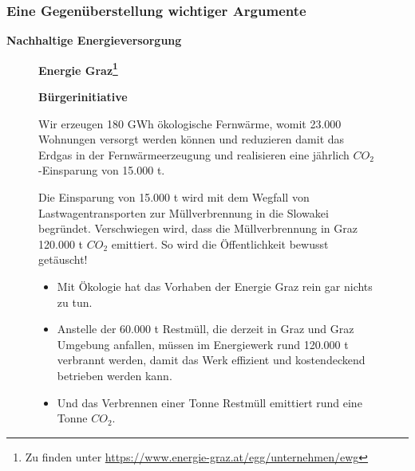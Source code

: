 \documentclass[8pt]{beamer}
\begin{document}
	\begin{frame}[t]
		\frametitle{Eine Gegenüberstellung wichtiger Argumente} 
		\textbf{Nachhaltige Energieversorgung}
		\begin{figure}[htbp]
			\begin{minipage}[t]{0.38\textwidth}
				\textbf{Energie Graz\footnote{Zu finden unter \url{https://www.energie-graz.at/egg/unternehmen/ewg}}}
			\end{minipage}
			\hfill
			\begin{minipage}[t]{0.58\textwidth}
				\textbf{Bürgerinitiative}
			\end{minipage}
		\end{figure}
		\begin{figure}[htbp]
			\begin{minipage}[t]{0.38\textwidth}
				\begin{framed}
				Wir erzeugen 180 GWh ökologische Fernwärme, womit 23.000 Wohnungen versorgt werden können und reduzieren damit das Erdgas in der Fernwärme\-erzeugung und realisieren eine jährlich $CO_2$-Einsparung von 15.000 t.
				\end{framed}
			\end{minipage}
			\hfill
			\begin{minipage}[t]{0.58\textwidth}
				\begin{framed}
				Die Einsparung von 15.000 t wird mit dem Wegfall von Lastwagentransporten
zur Müllverbrennung in die Slowakei begründet. Verschwiegen wird, dass die
Müllverbrennung in Graz 120.000 t $CO_2$ emittiert. So wird die Öffentlichkeit
bewusst getäuscht!
                                  \begin{itemize}
                                        \item Mit Ökologie hat das Vorhaben der Energie Graz rein gar nichts zu tun.
                                                \item Anstelle der 60.000 t Restmüll, die derzeit in Graz und Graz Umgebung anfallen, müssen im Energiewerk rund 120.000 t verbrannt werden, damit das Werk effizient und kostendeckend betrieben werden kann.
                                             \item Und das Verbrennen einer Tonne Restmüll emittiert rund eine Tonne $CO_2$.  
                      \end{itemize}
				\end{framed}
			\end{minipage}
		\end{figure}
	\end{frame}		
\end{document}
